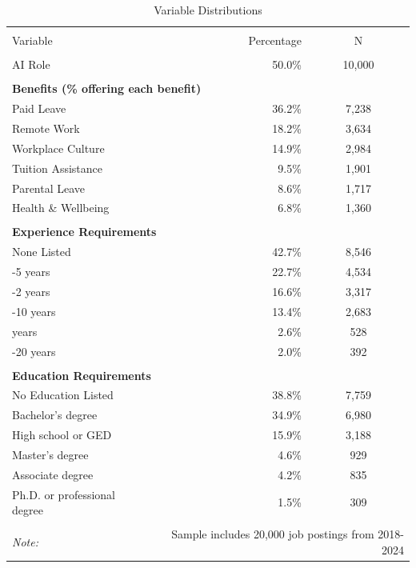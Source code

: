 \begin{table}[!htbp] \centering
\caption{Variable Distributions}
\label{tab:var_distributions_clean}
\begin{tabular}{lrc}
\\[-1.8ex]\hline
\hline \\[-1.8ex]
Variable & Percentage & N \\
\hline \\[-1.8ex]
AI Role & 50.0\% & 10,000 \\
\hline \\[-1.8ex]
\multicolumn{3}{l}{\textbf{Benefits (\% offering each benefit)}} \\
\quad Paid Leave & 36.2\% & 7,238 \\
\quad Remote Work & 18.2\% & 3,634 \\
\quad Workplace Culture & 14.9\% & 2,984 \\
\quad Tuition Assistance & 9.5\% & 1,901 \\
\quad Parental Leave & 8.6\% & 1,717 \\
\quad Health \& Wellbeing & 6.8\% & 1,360 \\
\hline \\[-1.8ex]
\multicolumn{3}{l}{\textbf{Experience Requirements}} \\
\quad None Listed & 42.7\% & 8,546 \\
\quad 3-5 years & 22.7\% & 4,534 \\
\quad 1-2 years & 16.6\% & 3,317 \\
\quad 6-10 years & 13.4\% & 2,683 \\
\quad 0 years & 2.6\% & 528 \\
\quad 11-20 years & 2.0\% & 392 \\
\hline \\[-1.8ex]
\multicolumn{3}{l}{\textbf{Education Requirements}} \\
\quad No Education Listed & 38.8\% & 7,759 \\
\quad Bachelor's degree & 34.9\% & 6,980 \\
\quad High school or GED & 15.9\% & 3,188 \\
\quad Master's degree & 4.6\% & 929 \\
\quad Associate degree & 4.2\% & 835 \\
\quad Ph.D. or professional degree & 1.5\% & 309 \\
\hline
\hline \\[-1.8ex]
\textit{Note:} & \multicolumn{2}{r}{Sample includes 20,000 job postings from 2018-2024} \\
\end{tabular}\end{table}
